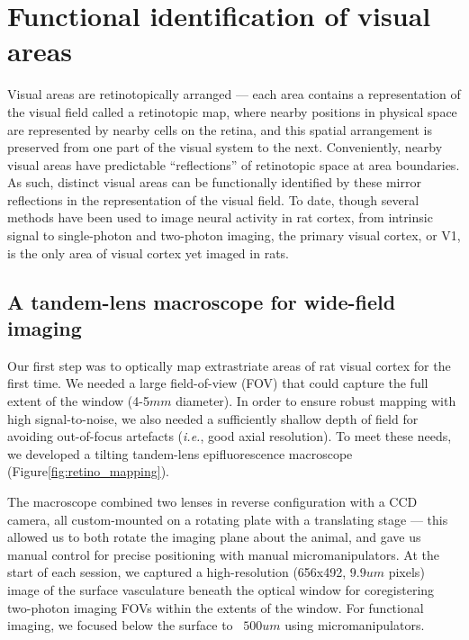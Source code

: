 \section{Functional identification of visual areas}
Visual areas are retinotopically arranged --- each area contains a representation of the visual field called a retinotopic map, where nearby positions in physical space are represented by nearby cells on the retina, and this spatial arrangement is preserved from one part of the visual system to the next\cite{REFREF}. Conveniently, nearby visual areas have predictable ``reflections'' of retinotopic space at area boundaries. As such, distinct visual areas can be functionally identified by these mirror reflections in the representation of the visual field. To date, though several methods have been used to image neural activity in rat cortex, from intrinsic signal\cite{Gias2004} to single-photon \cite{Scott2018ImagingMacroscope} and two-photon \cite{Ohki2005, Greenberg2008} imaging, the primary visual cortex, or V1, is the only area of visual cortex yet imaged in rats.

\subsection{A tandem-lens macroscope for wide-field imaging}
Our first step was to optically map extrastriate areas of rat visual cortex for the first time. We needed a large field-of-view (FOV) that could capture the full extent of the window (4-5$mm$ diameter). In order to ensure robust mapping with high signal-to-noise, we also needed a sufficiently shallow depth of field for avoiding out-of-focus artefacts (\textit{i.e.}, good axial resolution). To meet these needs, we developed a tilting tandem-lens epifluorescence macroscope\cite{Ratzlaff1991} (Figure\ref{fig:retino_mapping}). 

The macroscope combined two lenses in reverse configuration with a CCD camera, all custom-mounted on a rotating plate with a translating stage --- this allowed us to both rotate the imaging plane about the animal, and gave us manual control for precise positioning with manual micromanipulators. At the start of each session, we captured a high-resolution (656x492, $9.9um$ pixels) image of the surface vasculature beneath the optical window for coregistering two-photon imaging FOVs within the extents of the window. For functional imaging, we focused below the surface to ~$500um$ using micromanipulators.


